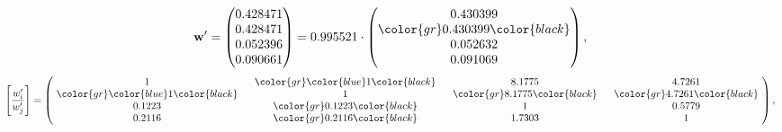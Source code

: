 \begin{example}
\begin{equation*}
\mathbf{w}^{\prime} =
\begin{pmatrix}
0.428471\\
0.428471\\
0.052396\\
0.090661
\end{pmatrix} =
0.995521\cdot
\begin{pmatrix}
0.430399\\
\color{gr} 0.430399\color{black} \\
0.052632\\
0.091069
\end{pmatrix},
\end{equation*}
\begin{equation*}
\left[ \frac{{w}^{\prime}_i}{{w}^{\prime}_j} \right] =
\begin{pmatrix}
$\,\,$ 1 $\,\,$ & $\,\,$\color{gr} \color{blue} 1\color{black} $\,\,$ & $\,\,$8.1775$\,\,$ & $\,\,$4.7261$\,\,$ \\
$\,\,$\color{gr} \color{blue} 1\color{black} $\,\,$ & $\,\,$ 1 $\,\,$ & $\,\,$\color{gr} 8.1775\color{black} $\,\,$ & $\,\,$\color{gr} 4.7261\color{black}   $\,\,$ \\
$\,\,$0.1223$\,\,$ & $\,\,$\color{gr} 0.1223\color{black} $\,\,$ & $\,\,$ 1 $\,\,$ & $\,\,$0.5779 $\,\,$ \\
$\,\,$0.2116$\,\,$ & $\,\,$\color{gr} 0.2116\color{black} $\,\,$ & $\,\,$1.7303$\,\,$ & $\,\,$ 1  $\,\,$ \\
\end{pmatrix},
\end{equation*}
\end{example}
\newpage
